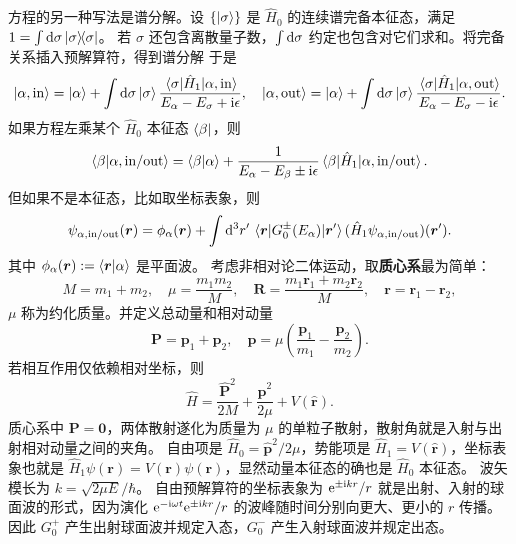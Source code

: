方程的另一种写法是谱分解。设 $\{\ket{\sigma}\}$ 是 $\hat H_0$ 的连续谱完备本征态，满足 $1=\int\dd{\sigma}\op{\sigma}$。
若 $\sigma$ 还包含离散量子数，$\int\dd{\sigma}$ 约定也包含对它们求和。将完备关系插入预解算符，得到谱分解
于是
\[
    \ket{\alpha,\mathrm{in}}
    =\ket{\alpha}
    +\int\dd{\sigma}\ket{\sigma}
    \frac{\mel{\sigma}{\hat H_1}{\alpha,\mathrm{in}}}
    {E_\alpha-E_\sigma+\mathrm{i}\epsilon},\quad
    \ket{\alpha,\mathrm{out}}
    =\ket{\alpha}
    +\int\dd{\sigma}\ket{\sigma}
    \frac{\mel{\sigma}{\hat H_1}{\alpha,\mathrm{out}}}
    {E_\alpha-E_\sigma-\mathrm{i}\epsilon}.
\]
如果方程左乘某个 $\hat H_0$ 本征态 $\bra{\beta}$，则
\[
    \ip{\beta}{\alpha,\mathrm{in/out}}=\ip{\beta}{\alpha} +\frac{1}{E_\alpha-E_\beta\pm\i\epsilon} \mel{\beta}{\hat H_1}{\alpha,\mathrm{in/out}}.
\]
但如果不是本征态，比如取坐标表象，则
\[
    \psi_{\alpha,\mathrm{in/out}}(\bm r) = \phi_\alpha(\bm r) + \int\dd[3]{r'}\mel{\bm r}{G_0^{\pm}(E_\alpha)}{\bm r'} (\hat H_1\psi_{\alpha,\mathrm{in/out}})(\bm r').
\]
其中 $\phi_\alpha(\bm r):=\ip{\bm r}{\alpha}$ 是平面波。
考虑非相对论二体运动，取\textbf{质心系}最为简单：
\[
    M=m_1+m_2,\quad \mu=\frac{m_1m_2}{M},\quad
    \bm R=\frac{m_1\bm r_1+m_2\bm r_2}{M},\quad
    \bm r=\bm r_1-\bm r_2,
\]
$\mu$ 称为约化质量。并定义总动量和相对动量
\[
    \bm P=\bm p_1+\bm p_2,\quad
    \bm p=\mu\left(\frac{\bm p_1}{m_1}-\frac{\bm p_2}{m_2}\right).
\]
若相互作用仅依赖相对坐标，则
\[
    \hat H=\frac{\hat{\bm P}^2}{2M}
    +\frac{\hat{\bm p}^2}{2\mu}+V(\hat{\bm r}).
\]
质心系中 $\bm P=\bm 0$，两体散射遂化为质量为 $\mu$ 的单粒子散射，散射角就是入射与出射相对动量之间的夹角。
自由项是 $\hat H_0=\hat{\bm p}^2/2\mu$，势能项是 $\hat H_1=V(\hat{\bm r})$，坐标表象也就是 $\hat H_1\psi(\bm r)=V(\bm r)\psi(\bm r)$，显然动量本征态的确也是 $\hat H_0$ 本征态。
波矢模长为 $k=\sqrt{2\mu E}/\hbar$。
自由预解算符的坐标表象为
$\mathrm{e}^{\pm\mathrm{i} k r}/r$ 就是出射、入射的球面波的形式，因为演化 $\mathrm{e}^{-\mathrm{i} \omega t}\mathrm{e}^{\pm\mathrm{i} k r}/r$ 的波峰随时间分别向更大、更小的 $r$ 传播。
因此 $G_0^+$ 产生出射球面波并规定入态，$G_0^-$ 产生入射球面波并规定出态。


